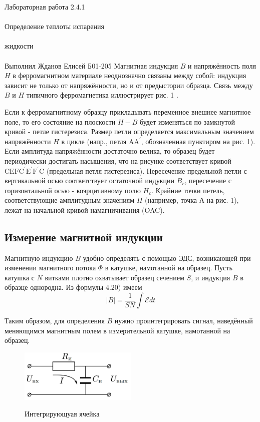 \documentclass{astroedu-lab}
\begin{document}
\begin{problem}{\huge Лабораторная работа 2.4.1\\\\Определение теплоты испарения\\\\жидкости\\\\Выполнил Жданов Елисей Б01-205}
Магнитная индукция $B$ и напряжённость поля $H$ в ферромагнитном материале неоднозначно связаны между собой: индукция зависит не только от напряжённости, но и от предыстории образца. Связь между $B$ и $H$ типичного ферромагнетика иллюстрирует рис. 1 .

Если к ферромагнитному образцу прикладывать переменное внешнее магнитное поле, то его состояние на плоскости $H-B$ будет изменяться по замкнутой кривой - петле гистерезиса. Размер петли определяется максимальным значением напряжённости $H$ в цикле (напр., петля $\mathrm{AA}^{\prime}$, обозначенная пунктиром на рис. 1). Если амплитуда напряжённости достаточно велика, то образец будет периодически достигать насыщения, что на рисунке соответствует кривой $\mathrm{CEFC}^{\prime} \mathrm{E}^{\prime} \mathrm{F}^{\prime} \mathrm{C}$ (предельная петля гистерезиса). Пересечение предельной петли с вертикальной осью соответствует остаточной индукции $B_r$, пересечение с горизонтальной осью - коэрцитивному полю $H_c$. Крайние точки петель, соответствующие амплитудным значениям $H$ (например, точка А на рис. 1), лежат на начальной кривой намагничивания (OAC).

\subsection{Измерение магнитной индукции}

Магнитную индукцию $B$ удобно определять с помощью ЭДС, возникающей при изменении магнитного потока $\Phi$ в катушке, намотанной на образец. Пусть катушка с $N$ витками плотно охватывает образец сечением $S$, и индукция $B$ в образце однородна. Из формулы 4.20$)$ имеем
$$
|B|=\frac{1}{S N} \int \mathcal{E} d t
$$

Таким образом, для определения $B$ нужно проинтегрировать сигнал, наведённый меняющимся магнитным полем в измерительной катушке, намотанной на образец.

\begin{figure}[!h]
	\centering
	\caption{Интегрирующуая ячейка}
	\includegraphics[width=0.5\textwidth]{theory2.png}
	\label{fig:boiler}
\end{figure}


\end{problem}
\end{document}
